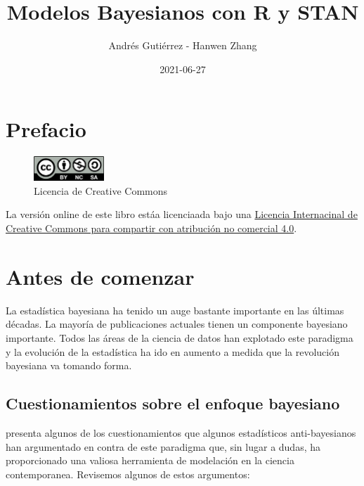 \documentclass[
  10pt,
  spanish,
]{book}
\title{Modelos Bayesianos con R y STAN}
\author{Andrés Gutiérrez - Hanwen Zhang}
\date{2021-06-27}
\theoremstyle{definition}
\theoremstyle{definition}
\theoremstyle{definition}
\theoremstyle{definition}
\theoremstyle{remark}
\begin{document}
\maketitle

{
\hypersetup{linkcolor=}
\setcounter{tocdepth}{1}
\tableofcontents
}
\listoftables
\listoffigures
\hypertarget{prefacio}{%
\chapter*{Prefacio}\label{prefacio}}

\begin{figure}
\includegraphics[width=100px]{Pics/CClicence} \caption{Licencia de Creative Commons}\label{fig:unnamed-chunk-1}
\end{figure}

La versión online de este libro estáa licenciaada bajo una \href{http://creativecommons.org/licenses/by-nc-sa/4.0/}{Licencia Internacinal de Creative Commons para compartir con atribución no comercial 4.0}.

\hypertarget{antes-de-comenzar}{%
\chapter*{Antes de comenzar}\label{antes-de-comenzar}}

La estadística bayesiana ha tenido un auge bastante importante en las últimas décadas. La mayoría de publicaciones actuales tienen un componente bayesiano importante. Todos las áreas de la ciencia de datos han explotado este paradigma y la evolución de la estadística ha ido en aumento a medida que la revolución bayesiana va tomando forma.

\hypertarget{cuestionamientos-sobre-el-enfoque-bayesiano}{%
\section*{Cuestionamientos sobre el enfoque bayesiano}\label{cuestionamientos-sobre-el-enfoque-bayesiano}}

\citet{GelmanObjections} presenta algunos de los cuestionamientos que algunos estadísticos anti-bayesianos han argumentado en contra de este paradigma que, sin lugar a dudas, ha proporcionado una valiosa herramienta de modelación en la ciencia contemporanea. Revisemos algunos de estos argumentos:
\end{document}
